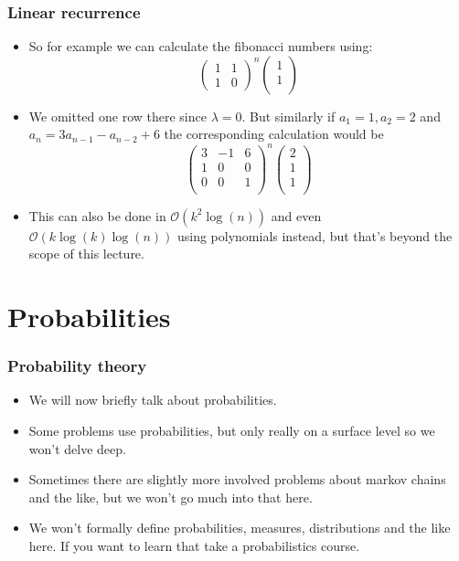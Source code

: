 \documentclass{beamer}
\newcommand\p[1]{\left(#1\right)}
\begin{document}
\begin{frame}[plain]
\frametitle{Linear recurrence}

\begin{itemize}

\item So for example we can calculate the fibonacci numbers using:
\[\p{\begin{matrix}1 & 1\\1 & 0\end{matrix}}^n\p{\begin{matrix}1\\1\\\end{matrix}}\]

\item We omitted one row there since $\lambda = 0$. But similarly if $a_1 = 1, a_2 = 2$ and $a_n = 3a_{n-1} - a_{n - 2} + 6$ the corresponding calculation would be
\[\p{\begin{matrix}3 & -1 & 6\\1 & 0 & 0\\0 & 0 & 1\\\end{matrix}}^n\p{\begin{matrix}2\\1\\1\\\end{matrix}}\]

\item This can also be done in $\mathcal{O}(k^2\log(n))$ and even $\mathcal{O}(k\log(k)\log(n))$ using polynomials instead, but that's beyond the scope of this lecture.

\end{itemize}

\end{frame}

\section*{Probabilities}

\begin{frame}[plain]
\frametitle{Probability theory}

\begin{itemize}

\item We will now briefly talk about probabilities.

\item Some problems use probabilities, but only really on a surface level so we won't delve deep.

\item Sometimes there are slightly more involved problems about markov chains and the like, but we won't go much into that here.

\item We won't formally define probabilities, measures, distributions and the like here. If you want to learn that take a probabilistics course.

\end{itemize}

\end{frame}
\end{document}
